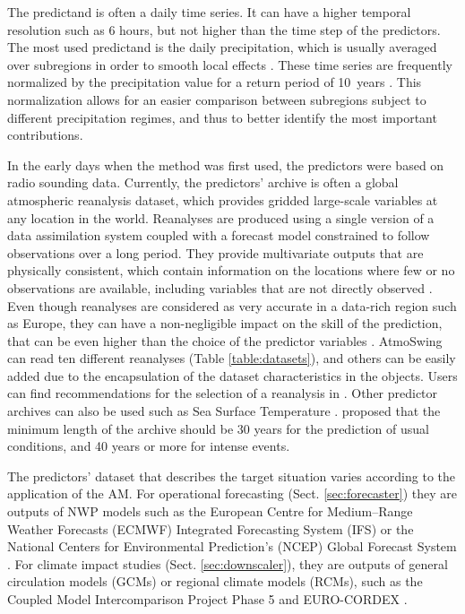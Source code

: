 \documentclass[gmd]{copernicus}
\begin{document}
The predictand is often a daily time series. It can have a higher temporal resolution such as 6 hours, but not higher than the time step of the predictors. The most used predictand is the daily precipitation, which is usually averaged over subregions in order to smooth local effects \citep{Obled2002, Marty2012}. These time series are frequently normalized by the precipitation value for a return period of 10~years \citep{Djerboua2001}. This normalization allows for an easier comparison between subregions subject to different precipitation regimes, and thus to better identify the most important contributions.

In the early days when the method was first used, the predictors were based on radio sounding data. Currently, the predictors' archive is often a global atmospheric reanalysis dataset, which provides gridded large-scale variables at any location in the world. Reanalyses are produced using a single version of a data assimilation system coupled with a forecast model constrained to follow observations over a long period. They provide multivariate outputs that are physically consistent, which contain information on the locations where few or no observations are available, including variables that are not directly observed \citep{Gelaro2017}. Even though reanalyses are considered as very accurate in a data-rich region such as Europe, they can have a non-negligible impact on the skill of the prediction, that can be even higher than the choice of the predictor variables \cite{Dayon2015, Horton2018b}. AtmoSwing can read ten different reanalyses (Table \ref{table:datasets}), and others can be easily added due to the encapsulation of the dataset characteristics in the objects. Users can find recommendations for the selection of a reanalysis in \cite{Horton2018b}. Other predictor archives can also be used such as Sea Surface Temperature \citep[SST, ][]{Reynolds2007}. \citet{Bontron2004} proposed that the minimum length of the archive should be 30 years for the prediction of usual conditions, and 40 years or more for intense events.

The predictors’ dataset that describes the target situation varies according to the application of the AM. For operational forecasting (Sect. \ref{sec:forecaster}) they are outputs of NWP models such as the European Centre for Medium--Range Weather Forecasts (ECMWF) Integrated Forecasting System (IFS) or the National Centers for Environmental Prediction's (NCEP) Global Forecast System \citep[GFS,][]{Kanamitsu1991,Kanamitsu1989}. For climate impact studies (Sect. \ref{sec:downscaler}), they are outputs of general circulation models (GCMs) or regional climate models (RCMs), such as the Coupled Model Intercomparison Project Phase 5 \citep[CMIP5,][]{Taylor2012} and EURO-CORDEX \citep{Jacob2014}.
\end{document}
